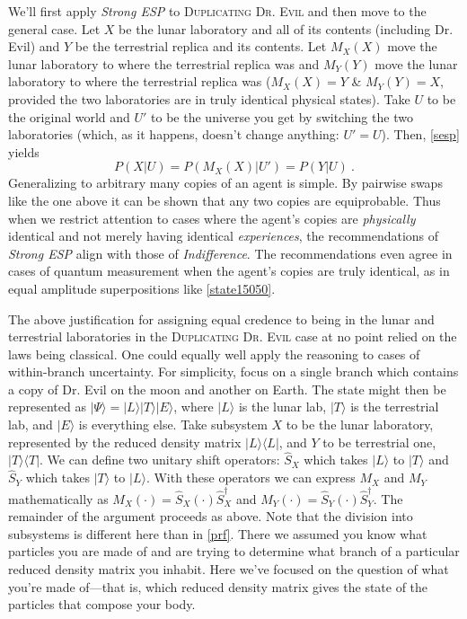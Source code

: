 \documentclass[onecolumn,secnumarabic,amsmath,amssymb,balancelastpage,nofootinbib]{article}
\begin{document}
We'll first apply \emph{Strong ESP} to \textsc{Duplicating Dr. Evil} and then move to the general case.  Let $X$ be the lunar laboratory and all of its contents (including Dr. Evil) and $Y$ be the terrestrial replica and its contents.  Let $M_X(X)$ move the lunar laboratory to where the terrestrial replica was and $M_Y(Y)$ move the lunar laboratory to where the terrestrial replica was ($M_X(X)=Y$ \& $M_Y(Y)=X$, provided the two laboratories are in truly identical physical states).  Take $U$ to be the original world and $U'$ to be the universe you get by switching the two laboratories (which, as it happens, doesn't change anything: $U'=U$).  Then, \eqref{sesp} yields
\begin{equation}
P(X|U)=P(M_X(X)|U')=P(Y|U)\ .
\end{equation}
Generalizing to arbitrary many copies of an agent is simple.  By pairwise swaps like the one above it can be shown that any two copies are equiprobable.  Thus when we restrict attention to cases where the agent's copies are \emph{physically} identical and not merely having identical \emph{experiences}, the recommendations of \emph{Strong ESP} align with those of \emph{Indifference}.  The recommendations even agree in cases of quantum measurement when the agent's copies are truly identical, as in equal amplitude superpositions like \eqref{state15050}.

The above justification for assigning equal credence to being in the lunar and terrestrial laboratories in the \textsc{Duplicating Dr. Evil} case at no point relied on the laws being classical.  One could equally well apply the reasoning to cases of within-branch uncertainty.  For simplicity, focus on a single branch which contains a copy of Dr. Evil on the moon and another on Earth.  The state might then be represented as $|\Psi\rangle=|L\rangle |T\rangle |E\rangle$, where $|L\rangle$ is the lunar lab, $|T\rangle$ is the terrestrial lab, and $|E\rangle$ is everything else.  Take subsystem $X$ to be the lunar laboratory, represented by the reduced density matrix $|L\rangle\langle L |$, and $Y$ to be terrestrial one, $|T\rangle\langle T |$.  We can define two unitary shift operators: $\widehat{S}_X$ which takes $|L\rangle$ to $|T\rangle$ and $\widehat{S}_Y$ which takes $|T\rangle$ to $|L\rangle$.  With these operators we can express $M_X$ and $M_Y$ mathematically as $M_X(\cdot)=\widehat{S}_X(\cdot)\widehat{S}^\dagger_X$ and $M_Y(\cdot)=\widehat{S}_Y(\cdot)\widehat{S}^\dagger_Y$.  The remainder of the argument proceeds as above.  Note that the division into subsystems is different here than in \textsection \ref{prf}.  There we assumed you know what particles you are made of and are trying to determine what branch of a particular reduced density matrix you inhabit.  Here we've focused on the question of what you're made of---that is, which reduced density matrix gives the state of the particles that compose your body.
\end{document}
